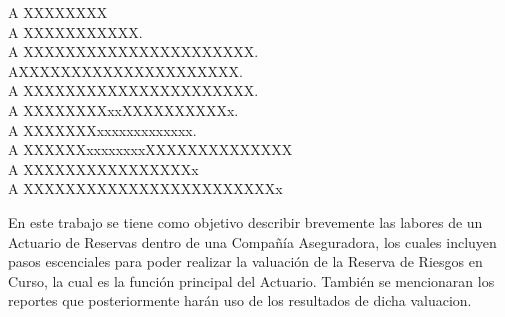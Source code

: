 \documentclass[11pt,twoside,openright,spanish]{report}
\numberwithin{equation}{chapter}
\numberwithin{figure}{chapter}
\numberwithin{table}{chapter}
\begin{document}
	\newpage
	$\ $
	\thispagestyle{empty} %
	
	\begin{acknowledgements}
	 
	A XXXXXXXX
	\\

	A XXXXXXXXXXX.
	\\
	
	A XXXXXXXXXXXXXXXXXXXXXX.
	\\
	
	AXXXXXXXXXXXXXXXXXXXXX.
	\\
	
	A XXXXXXXXXXXXXXXXXXXXXX.
	\\
	
	A XXXXXXXXxxXXXXXXXXXXx.
	\\
	
	A XXXXXXXxxxxxxxxxxxxx.   
	\\
	
	A XXXXXXxxxxxxxxXXXXXXXXXXXXXX
	\\
	
	A XXXXXXXXXXXXXXXXx
	\\
	
	A XXXXXXXXXXXXXXXXXXXXXXXXx
	\\
	
		
	\end{acknowledgements}
	
	
	\tableofcontents
	
	
	\addtolength{\headheight}{\baselineskip}
	\pagestyle{fancy}
	\cleardoublepage
		
	\begin{preface}
	\doublespacing
	
	En este trabajo se tiene como objetivo describir brevemente las labores de un Actuario de Reservas dentro de una Compañía Aseguradora, los cuales incluyen pasos escenciales para poder realizar la valuación de la Reserva de Riesgos en Curso, la cual es la función principal del Actuario. También se mencionaran los reportes que posteriormente harán uso de los resultados de dicha valuacion.
		
	\end{preface}
	
\end{document}
